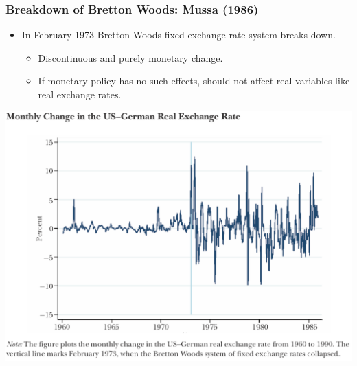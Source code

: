 \documentclass[english,xcolor=svgnames]{beamer}
\begin{document}
\begin{frame}
\frametitle{Breakdown of Bretton Woods: Mussa (1986)}
\begin{itemize}
	\item In February 1973 Bretton Woods fixed exchange rate system breaks down.
	\begin{itemize}
		\item Discontinuous and purely monetary change.
		\item If monetary policy has no such effects, should not affect real
variables like real exchange rates.
	\end{itemize}
\end{itemize}
\centering
\includegraphics[scale=0.4]{../../Images/NS2018mussa.png}
\end{frame}
\end{document}
